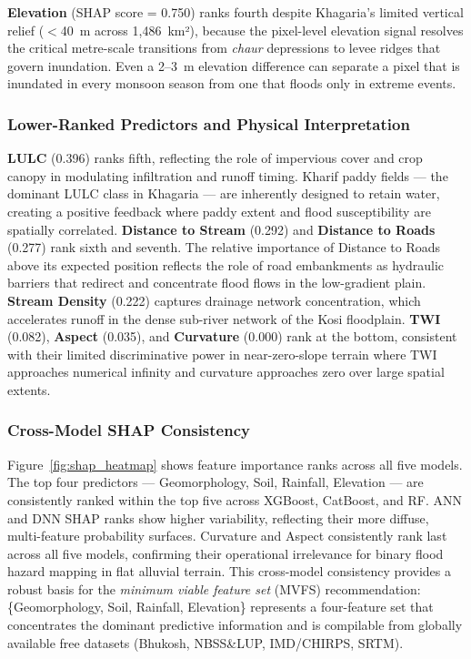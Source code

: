 \documentclass[12pt, a4paper]{article}
\begin{document}
\textbf{Elevation} (SHAP score = 0.750) ranks fourth despite Khagaria's limited vertical relief ($<$40~m across 1{,}486~km²), because the pixel-level elevation signal resolves the critical metre-scale transitions from \textit{chaur} depressions to levee ridges that govern inundation.  Even a 2--3~m elevation difference can separate a pixel that is inundated in every monsoon season from one that floods only in extreme events.

\subsubsection{Lower-Ranked Predictors and Physical Interpretation}

\textbf{LULC} (0.396) ranks fifth, reflecting the role of impervious cover and crop canopy in modulating infiltration and runoff timing. Kharif paddy fields --- the dominant LULC class in Khagaria --- are inherently designed to retain water, creating a positive feedback where paddy extent and flood susceptibility are spatially correlated. \textbf{Distance to Stream} (0.292) and \textbf{Distance to Roads} (0.277) rank sixth and seventh.  The relative importance of Distance to Roads above its expected position reflects the role of road embankments as hydraulic barriers that redirect and concentrate flood flows in the low-gradient plain. \textbf{Stream Density} (0.222) captures drainage network concentration, which accelerates runoff in the dense sub-river network of the Kosi floodplain.  \textbf{TWI} (0.082), \textbf{Aspect} (0.035), and \textbf{Curvature} (0.000) rank at the bottom, consistent with their limited discriminative power in near-zero-slope terrain where TWI approaches numerical infinity and curvature approaches zero over large spatial extents.

\subsubsection{Cross-Model SHAP Consistency}

Figure~\ref{fig:shap_heatmap} shows feature importance ranks across all five models.  The top four predictors --- Geomorphology, Soil, Rainfall, Elevation --- are consistently ranked within the top five across XGBoost, CatBoost, and RF.  ANN and DNN SHAP ranks show higher variability, reflecting their more diffuse, multi-feature probability surfaces.  Curvature and Aspect consistently rank last across all five models, confirming their operational irrelevance for binary flood hazard mapping in flat alluvial terrain.  This cross-model consistency provides a robust basis for the \textit{minimum viable feature set} (MVFS) recommendation: \{Geomorphology, Soil, Rainfall, Elevation\} represents a four-feature set that concentrates the dominant predictive information and is compilable from globally available free datasets (Bhukosh, NBSS\&LUP, IMD/CHIRPS, SRTM).
\end{document}
